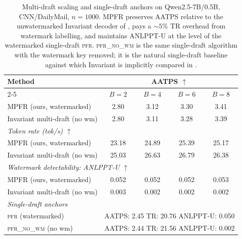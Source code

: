 \begin{table}[t]
\centering
\small
\caption{
Multi-draft scaling and single-draft anchors on Qwen2.5-7B/0.5B,
CNN/DailyMail, $n=1000$.  \textsc{MPFR} preserves AATPS relative to the
unwatermarked Invariant decoder of \citet{rowan2025list}, pays a
$\sim\!5\%$ TR overhead from watermark labelling, and maintains
ANLPPT-U at the level of the watermarked single-draft \textsc{pfr}.
\textsc{pfr\_no\_wm} is the same single-draft algorithm with the watermark
key removed; it is the natural single-draft baseline against which
Invariant is implicitly compared in \citet{rowan2025list}.
}
\label{tab:headline}
\begin{tabular}{lcccc}
\toprule
\multirow{2}{*}{Method}
& \multicolumn{4}{c}{AATPS $\uparrow$} \\
\cmidrule(lr){2-5}
& $B=2$ & $B=4$ & $B=6$ & $B=8$ \\
\midrule
\textsc{MPFR} (ours, watermarked)  & 2.80 & 3.12 & 3.30 & 3.41 \\
Invariant multi-draft (no wm)      & 2.80 & 3.11 & 3.28 & 3.39 \\
\midrule
\multicolumn{5}{l}{\textit{Token rate (tok/s) $\uparrow$}} \\
\midrule
\textsc{MPFR} (ours, watermarked)  & 23.18 & 24.89 & 25.39 & 25.17 \\
Invariant multi-draft (no wm)      & 25.03 & 26.63 & 26.79 & 26.38 \\
\midrule
\multicolumn{5}{l}{\textit{Watermark detectability: ANLPPT-U $\uparrow$}} \\
\midrule
\textsc{MPFR} (ours, watermarked)  & 0.052 & 0.052 & 0.052 & 0.053 \\
Invariant multi-draft (no wm)      & 0.003 & 0.002 & 0.002 & 0.002 \\
\midrule
\multicolumn{5}{l}{\textit{Single-draft anchors}} \\
\midrule
\textsc{pfr} (watermarked)         & \multicolumn{4}{c}{AATPS: 2.45 \quad TR: 20.76 \quad ANLPPT-U: 0.050} \\
\textsc{pfr\_no\_wm} (no wm)       & \multicolumn{4}{c}{AATPS: 2.44 \quad TR: 21.56 \quad ANLPPT-U: 0.002} \\
\bottomrule
\end{tabular}
\end{table}


